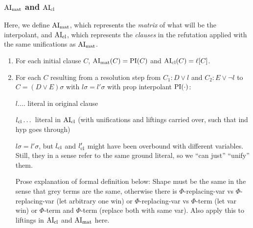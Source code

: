 \documentclass[,%
	paper=a4,%
	DIV12, %
	twoside=false,%
	liststotoc,
	bibtotoc,
	draft=false,%
	numbers=noendperiod
]{scrartcl}
\begin{document}
\subsubsection{$\operatorname{AI}_\mathrm{mat}$ and $\operatorname{AI}_\mathrm{cl}$}

Here, we define $\operatorname{AI}_\mathrm{mat}$, which represents the \emph{matrix} of what will be the interpolant, and $\operatorname{AI}_\mathrm{cl}$, which represents the \emph{clauses} in the refutation applied with the same unifications as $\operatorname{AI}_\mathrm{mat}$.

\begin{enumerate}
	\item 
		For each initial clause $C$, $\operatorname{AI}_\mathrm{mat}(C) = \operatorname{PI}(C)$ and $\operatorname{AI}_\mathrm{cl}(C) = \ell[C]$.

	\item
		For each $C$ resulting from a resolution step from $C_1: D\lor l$ and $C_2: E\lor \lnot l$ to $C = (D \lor E)\sigma$ with $l\sigma = l'\sigma$ with prop interpolant $\operatorname{PI}(\cdot)$:

		$l.\dotsc$ literal in original clause

		$l_\mathrm{cl}\dotsc$ literal in $\operatorname{AI}_\mathrm{cl}$ (with unifications and liftings carried over, such that ind hyp goes through)


		$l\sigma = l'\sigma$, but $l_\mathrm{cl}$ and $l_\mathrm{cl}'$ might have been overbound with different variables. Still, they in a sense refer to the same ground literal, so we ``can just'' ``unify'' them.
		
		Prose explanation of formal definition below: Shape must be the same in the sense that grey terms are the same, otherwise there is $\Phi$-replacing-var vs $\Phi$-replacing-var (let arbitrary one win) or $\Phi$-replacing-var vs $\Phi$-term (let var win) or $\Phi$-term and $\Phi$-term (replace both with same var). 
		Also apply this to liftings in $\operatorname{AI}_\mathrm{cl}$ and $\operatorname{AI}_\mathrm{mat}$ here.


\end{enumerate}
\end{document}
